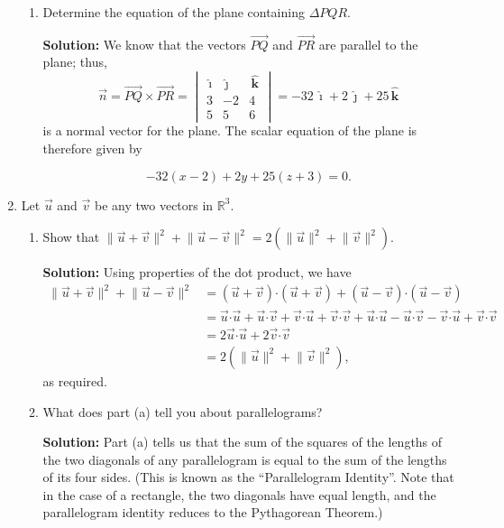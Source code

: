 \documentclass[letterpaper,12pt]{article}
\newcommand{\len}[1]{\lVert #1\rVert}
\newcommand{\R}{\mathbb{R}}
\newcommand{\dotp}{\boldsymbol{\cdot}}
\newcommand{\ivec}{\,\boldsymbol{\hat{\imath}}}
\newcommand{\jvec}{\,\boldsymbol{\hat{\jmath}}}
\newcommand{\kvec}{\,\boldsymbol{\hat{k}}}
\newcommand{\bvm}{\begin{vmatrix}}
\newcommand{\evm}{\end{vmatrix}}
\begin{document}
\begin{enumerate}
\begin{enumerate}
 \item Determine the equation of the plane containing $\Delta PQR$.

\bigskip

{\bf Solution:} We know that the vectors $\overrightarrow{PQ}$ and $\overrightarrow{PR}$ are parallel to the plane; thus,
\[
 \vec{n} = \overrightarrow{PQ}\times\overrightarrow{PR} = \bvm \ivec & \jvec & \kvec\\3&-2&4\\5&5&6\evm = -32\ivec+2\jvec+25\kvec
\]
is a normal vector for the plane. The scalar equation of the plane is therefore given by

\[
 -32(x-2)+2y+25(z+3)=0.
\]

\medskip

\end{enumerate}
\item Let $\vec{u}$ and $\vec{v}$ be any two vectors in $\R^3$.
\begin{enumerate}
 \item Show that $\len{\vec{u}+\vec{v}}^2+\len{\vec{u}-\vec{v}}^2 = 2(\len{\vec{u}}^2+\len{\vec{v}}^2)$.

\bigskip

{\bf Solution:} Using properties of the dot product, we have
\begin{align*}
 \len{\vec{u}+\vec{v}}^2+\len{\vec{u}-\vec{v}}^2 & = (\vec{u}+\vec{v})\dotp (\vec{u}+\vec{v}) + (\vec{u}-\vec{v})\dotp (\vec{u}-\vec{v})\\
 & = \vec{u}\dotp\vec{u}+\vec{u}\dotp\vec{v}+\vec{v}\dotp\vec{u}+\vec{v}\dotp\vec{v} + \vec{u}\dotp\vec{u}-\vec{u}\dotp\vec{v}-\vec{v}\dotp\vec{u}+\vec{v}\dotp\vec{v}\\
 & = 2\vec{u}\dotp\vec{u}+2\vec{v}\dotp\vec{v}\\
 & = 2(\len{\vec{u}}^2+\len{\vec{v}}^2),
\end{align*}
as required.

\medskip

 \item What does part (a) tell you about parallelograms?

\bigskip

{\bf Solution:} Part (a) tells us that the sum of the squares of the lengths of the two diagonals of any parallelogram is equal to the sum of the lengths of its four sides. (This is known as the ``Parallelogram Identity''. Note that in the case of a rectangle, the two diagonals have equal length, and the parallelogram identity reduces to the Pythagorean Theorem.)


\end{enumerate}
\end{enumerate}
\end{document}
